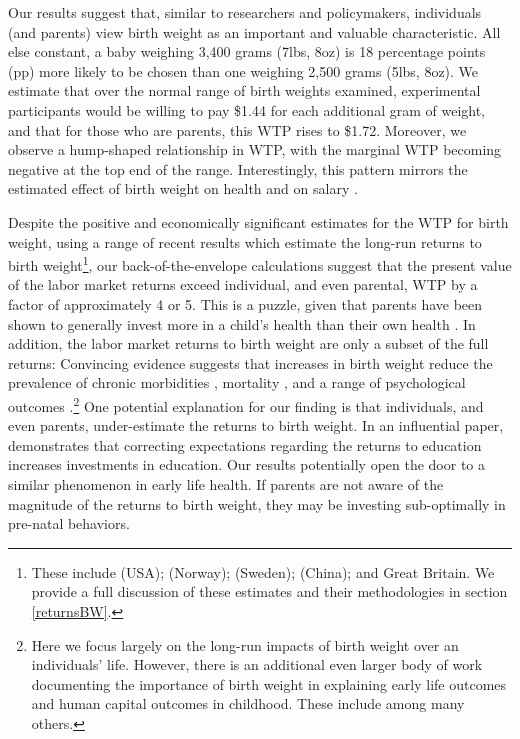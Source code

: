 \documentclass[a4paper, 11pt]{article}
\begin{document}
\begin{spacing}{1.4}
Our results suggest that, similar to researchers and policymakers,
individuals (and parents) view birth weight as an important and valuable characteristic.
All else constant, a baby weighing 3,400 grams (7lbs, 8oz) is 18 percentage
points (pp) more likely to be chosen than one weighing 2,500 grams (5lbs, 8oz).
We estimate that over the normal range of birth weights examined,
experimental participants would be willing to pay \$1.44 for each
additional gram of weight, and that for those who are parents, this
WTP rises to \$1.72.  Moreover, we observe a hump-shaped relationship
in WTP, with the marginal WTP becoming negative
at the top end of the range.  Interestingly, this pattern mirrors
the estimated effect of birth weight on health \citep{Caseetal2005}
and on salary \citep{BehrmanRosenzweig2004}.

Despite the positive and economically significant estimates for the
WTP for birth weight, using a range of recent results which estimate
the long-run returns to birth weight\footnote{These include
  \citet{JohnsonSchoeni2011,CookFletcher2015,BehrmanRosenzweig2004} (USA);
  \citet{Blacketal2007} (Norway); \citet{Bharadwajetal2015} (Sweden);
  \citet{RosenzweigZhang2013} (China); and \citet{CurrieHyson1999,
    Caseetal2005} Great Britain.  We provide a full discussion of these
  estimates and their methodologies in section \ref{returnsBW}.},
our back-of-the-envelope calculations suggest that the present value of the
labor market returns exceed individual, and even parental, WTP by a factor
of approximately 4 or 5. This is a puzzle, given that parents have been
shown to generally invest more in a child's health than their own
health \citep{AgeeCrocker2008}. In addition, the labor market returns
to birth weight are only a subset of the full returns: Convincing
evidence suggests that increases in birth weight reduce the prevalence
of chronic morbidities \citep{Barker1995,AlmondMazumder2005,
  JohnsonSchoeni2011b}, mortality \citep{vandenBergetal2006}, and a
range of psychological outcomes \citep{Fletcher2011}.\footnote{Here we
  focus largely on the long-run impacts of birth weight over an
  individuals' life.  However, there is an additional even larger body of
  work documenting the importance of birth weight in explaining early life
  outcomes and human capital outcomes in childhood. These include
  \citet{Almondetal2005,Oreopoulosetal2008,Guptaetal2013,Conleyetal2003,
    Figlioetal2014,LinLiu2009,Fletcher2011,Bharadwajetal2017,
    TorcheEchevarria2011} among many others.}
One potential explanation for our finding is that individuals, and even parents, under-estimate
the returns to birth weight. In an influential paper, \citet{Jensen2010}
demonstrates that correcting expectations regarding the returns to
education increases investments in education. Our results potentially
open the door to a similar phenomenon in early life health.  If parents
are not aware of the magnitude of the returns to birth weight, they may be
investing sub-optimally in pre-natal behaviors.


\end{spacing}
\end{document}

